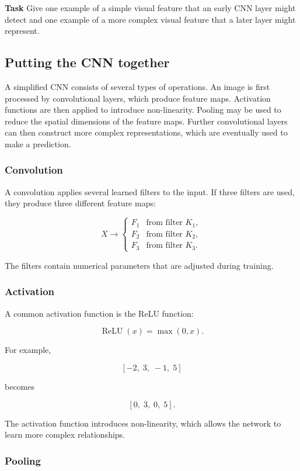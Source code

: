 \documentclass{course_sheet}
\begin{document}
\textbf{Task} Give one example of a simple visual feature that an early CNN layer might detect and one example of a more complex visual feature that a later layer might represent.

\subsection*{Putting the CNN together}

A simplified CNN consists of several types of operations. An image is first processed by convolutional layers, which produce feature maps. Activation functions are then applied to introduce non-linearity. Pooling may be used to reduce the spatial dimensions of the feature maps. Further convolutional layers can then construct more complex representations, which are eventually used to make a prediction.

\subsubsection*{Convolution}

A convolution applies several learned filters to the input. If three filters are used, they produce three different feature maps:

\[
X \longrightarrow
\begin{cases}
F_1 & \text{from filter } K_1,\\
F_2 & \text{from filter } K_2,\\
F_3 & \text{from filter } K_3.
\end{cases}
\]

The filters contain numerical parameters that are adjusted during training.

\subsubsection*{Activation}

A common activation function is the ReLU function:

\[
\operatorname{ReLU}(x)=\max(0,x).
\]

For example,

\[
[-2,\;3,\;-1,\;5]
\]

becomes

\[
[0,\;3,\;0,\;5].
\]

The activation function introduces non-linearity, which allows the network to learn more complex relationships.

\subsubsection*{Pooling}
\end{document}
